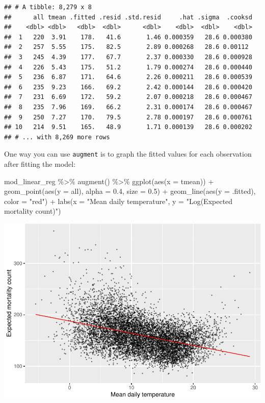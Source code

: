 \documentclass[
]{book}
\newenvironment{Shaded}{\begin{snugshade}}{\end{snugshade}}
\newcommand{\AttributeTok}[1]{\textcolor[rgb]{0.77,0.63,0.00}{#1}}
\newcommand{\FloatTok}[1]{\textcolor[rgb]{0.00,0.00,0.81}{#1}}
\newcommand{\FunctionTok}[1]{\textcolor[rgb]{0.00,0.00,0.00}{#1}}
\newcommand{\NormalTok}[1]{#1}
\newcommand{\SpecialCharTok}[1]{\textcolor[rgb]{0.00,0.00,0.00}{#1}}
\newcommand{\StringTok}[1]{\textcolor[rgb]{0.31,0.60,0.02}{#1}}
\begin{document}
\begin{verbatim}
## # A tibble: 8,279 x 8
##      all tmean .fitted .resid .std.resid     .hat .sigma  .cooksd
##    <dbl> <dbl>   <dbl>  <dbl>      <dbl>    <dbl>  <dbl>    <dbl>
##  1   220  3.91    178.   41.6       1.46 0.000359   28.6 0.000380
##  2   257  5.55    175.   82.5       2.89 0.000268   28.6 0.00112 
##  3   245  4.39    177.   67.7       2.37 0.000330   28.6 0.000928
##  4   226  5.43    175.   51.2       1.79 0.000274   28.6 0.000440
##  5   236  6.87    171.   64.6       2.26 0.000211   28.6 0.000539
##  6   235  9.23    166.   69.2       2.42 0.000144   28.6 0.000420
##  7   231  6.69    172.   59.2       2.07 0.000218   28.6 0.000467
##  8   235  7.96    169.   66.2       2.31 0.000174   28.6 0.000467
##  9   250  7.27    170.   79.5       2.78 0.000197   28.6 0.000761
## 10   214  9.51    165.   48.9       1.71 0.000139   28.6 0.000202
## # ... with 8,269 more rows
\end{verbatim}

One way you can use \texttt{augment} is to graph the fitted values for each observation
after fitting the model:

\begin{Shaded}
\begin{Highlighting}[]
\NormalTok{mod\_linear\_reg }\SpecialCharTok{\%\textgreater{}\%} 
  \FunctionTok{augment}\NormalTok{() }\SpecialCharTok{\%\textgreater{}\%} 
  \FunctionTok{ggplot}\NormalTok{(}\FunctionTok{aes}\NormalTok{(}\AttributeTok{x =}\NormalTok{ tmean)) }\SpecialCharTok{+} 
  \FunctionTok{geom\_point}\NormalTok{(}\FunctionTok{aes}\NormalTok{(}\AttributeTok{y =}\NormalTok{ all), }\AttributeTok{alpha =} \FloatTok{0.4}\NormalTok{, }\AttributeTok{size =} \FloatTok{0.5}\NormalTok{) }\SpecialCharTok{+} 
  \FunctionTok{geom\_line}\NormalTok{(}\FunctionTok{aes}\NormalTok{(}\AttributeTok{y =}\NormalTok{ .fitted), }\AttributeTok{color =} \StringTok{"red"}\NormalTok{) }\SpecialCharTok{+} 
  \FunctionTok{labs}\NormalTok{(}\AttributeTok{x =} \StringTok{"Mean daily temperature"}\NormalTok{, }\AttributeTok{y =} \StringTok{"Log(Expected mortality count)"}\NormalTok{)}
\end{Highlighting}
\end{Shaded}

\includegraphics{adv_epi_analysis_files/figure-latex/unnamed-chunk-28-1.pdf}
\end{document}
